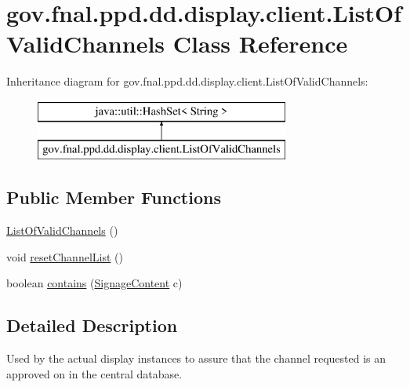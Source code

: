 \hypertarget{classgov_1_1fnal_1_1ppd_1_1dd_1_1display_1_1client_1_1ListOfValidChannels}{\section{gov.\-fnal.\-ppd.\-dd.\-display.\-client.\-List\-Of\-Valid\-Channels Class Reference}
\label{classgov_1_1fnal_1_1ppd_1_1dd_1_1display_1_1client_1_1ListOfValidChannels}
}
Inheritance diagram for gov.\-fnal.\-ppd.\-dd.\-display.\-client.\-List\-Of\-Valid\-Channels\-:\begin{figure}[H]
\begin{center}
\leavevmode
\includegraphics[height=2.000000cm]{classgov_1_1fnal_1_1ppd_1_1dd_1_1display_1_1client_1_1ListOfValidChannels}
\end{center}
\end{figure}
\subsection*{Public Member Functions}
\begin{DoxyCompactItemize}
\item 
\hyperlink{classgov_1_1fnal_1_1ppd_1_1dd_1_1display_1_1client_1_1ListOfValidChannels_a32b06c35045255ed512433f0a9c3d115}{List\-Of\-Valid\-Channels} ()
\item 
void \hyperlink{classgov_1_1fnal_1_1ppd_1_1dd_1_1display_1_1client_1_1ListOfValidChannels_ac7e8b27fed18f295c739273b25cc16f3}{reset\-Channel\-List} ()
\item 
boolean \hyperlink{classgov_1_1fnal_1_1ppd_1_1dd_1_1display_1_1client_1_1ListOfValidChannels_a46ab473927c0c932b8465dd400e5058b}{contains} (\hyperlink{interfacegov_1_1fnal_1_1ppd_1_1dd_1_1signage_1_1SignageContent}{Signage\-Content} c)
\end{DoxyCompactItemize}


\subsection{Detailed Description}
Used by the actual display instances to assure that the channel requested is an approved on in the central database.

